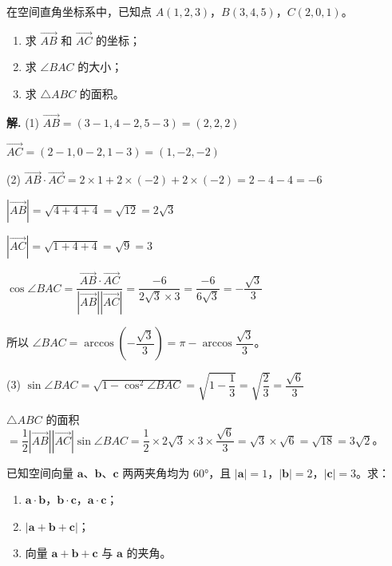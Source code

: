 \documentclass[11pt]{ctexrep}
\begin{document}
\begin{realexam}[2024 上海一模]
    在空间直角坐标系中，已知点 $A(1, 2, 3)$，$B(3, 4, 5)$，$C(2, 0, 1)$。
    \begin{enumerate}
        \item 求 $\overrightarrow{AB}$ 和 $\overrightarrow{AC}$ 的坐标；
        \item 求 $\angle BAC$ 的大小；
        \item 求 $\triangle ABC$ 的面积。
    \end{enumerate}
\end{realexam}

\textbf{解.} (1) $\overrightarrow{AB} = (3-1, 4-2, 5-3) = (2, 2, 2)$

$\overrightarrow{AC} = (2-1, 0-2, 1-3) = (1, -2, -2)$

(2) $\overrightarrow{AB} \cdot \overrightarrow{AC} = 2 \times 1 + 2 \times (-2) + 2 \times (-2) = 2 - 4 - 4 = -6$

$|\overrightarrow{AB}| = \sqrt{4 + 4 + 4} = \sqrt{12} = 2\sqrt{3}$

$|\overrightarrow{AC}| = \sqrt{1 + 4 + 4} = \sqrt{9} = 3$

$\cos\angle BAC = \dfrac{\overrightarrow{AB} \cdot \overrightarrow{AC}}{|\overrightarrow{AB}||\overrightarrow{AC}|} = \dfrac{-6}{2\sqrt{3} \times 3} = \dfrac{-6}{6\sqrt{3}} = -\dfrac{\sqrt{3}}{3}$

所以 $\angle BAC = \arccos\left(-\dfrac{\sqrt{3}}{3}\right) = \pi - \arccos\dfrac{\sqrt{3}}{3}$。

(3) $\sin\angle BAC = \sqrt{1 - \cos^2\angle BAC} = \sqrt{1 - \dfrac{1}{3}} = \sqrt{\dfrac{2}{3}} = \dfrac{\sqrt{6}}{3}$

$\triangle ABC$ 的面积 $= \dfrac{1}{2}|\overrightarrow{AB}||\overrightarrow{AC}|\sin\angle BAC = \dfrac{1}{2} \times 2\sqrt{3} \times 3 \times \dfrac{\sqrt{6}}{3} = \sqrt{3} \times \sqrt{6} = \sqrt{18} = 3\sqrt{2}$。

\begin{realexam}[2025 上海二模]
    已知空间向量 $\boldsymbol{a}$、$\boldsymbol{b}$、$\boldsymbol{c}$ 两两夹角均为 $60°$，且 $|\boldsymbol{a}| = 1$，$|\boldsymbol{b}| = 2$，$|\boldsymbol{c}| = 3$。求：
    \begin{enumerate}
        \item $\boldsymbol{a} \cdot \boldsymbol{b}$，$\boldsymbol{b} \cdot \boldsymbol{c}$，$\boldsymbol{a} \cdot \boldsymbol{c}$；
        \item $|\boldsymbol{a} + \boldsymbol{b} + \boldsymbol{c}|$；
        \item 向量 $\boldsymbol{a} + \boldsymbol{b} + \boldsymbol{c}$ 与 $\boldsymbol{a}$ 的夹角。
    \end{enumerate}
\end{realexam}
\end{document}
